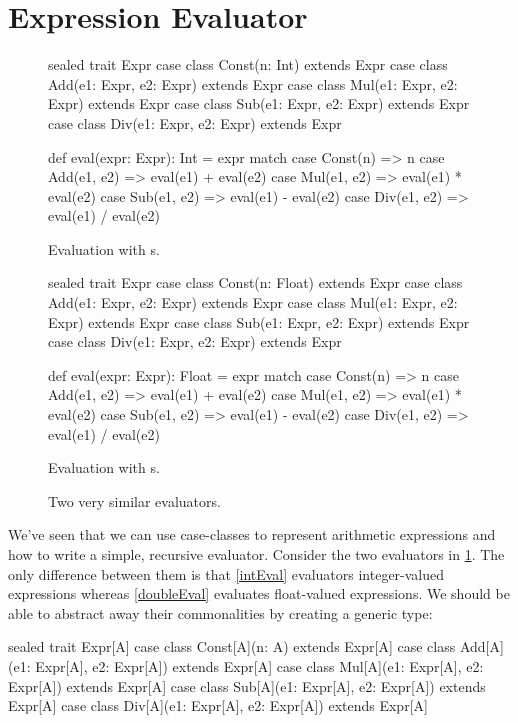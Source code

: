 \documentclass[9pt]{extbook}
\begin{document}
\section{Expression Evaluator}


\begin{figure}
\begin{minipage}{0.45\textwidth}
\begin{scalacode}
sealed trait Expr
case class Const(n: Int) extends Expr
case class Add(e1: Expr, e2: Expr) extends Expr
case class Mul(e1: Expr, e2: Expr) extends Expr
case class Sub(e1: Expr, e2: Expr) extends Expr
case class Div(e1: Expr, e2: Expr) extends Expr

def eval(expr: Expr): Int = expr match {
  case Const(n) => n
  case Add(e1, e2) => eval(e1) + eval(e2)
  case Mul(e1, e2) => eval(e1) * eval(e2)
  case Sub(e1, e2) => eval(e1) - eval(e2)
  case Div(e1, e2) => eval(e1) / eval(e2)
}
\end{scalacode}
\caption{Evaluation with s.}
\label{intEval}
\end{minipage}
\quad\vrule\quad
\begin{minipage}{0.45\textwidth}
\begin{scalacode}
sealed trait Expr
case class Const(n: Float) extends Expr
case class Add(e1: Expr, e2: Expr) extends Expr
case class Mul(e1: Expr, e2: Expr) extends Expr
case class Sub(e1: Expr, e2: Expr) extends Expr
case class Div(e1: Expr, e2: Expr) extends Expr

def eval(expr: Expr): Float = expr match {
  case Const(n) => n
  case Add(e1, e2) => eval(e1) + eval(e2)
  case Mul(e1, e2) => eval(e1) * eval(e2)
  case Sub(e1, e2) => eval(e1) - eval(e2)
  case Div(e1, e2) => eval(e1) / eval(e2)
}
\end{scalacode}
\caption{Evaluation with s.}
\label{doubleEval}
\end{minipage}
\caption{Two very similar evaluators.}\label{twoevals}
\end{figure}


We've seen that we can use case-classes to represent arithmetic expressions
and how to write a simple, recursive evaluator. Consider the two evaluators
in \cref{twoevals}. The only difference between them is that \cref{intEval}
evaluators integer-valued expressions whereas \cref{doubleEval} evaluates
float-valued expressions. We should be able to abstract away their commonalities
by creating a generic type:

\begin{scalacode}
sealed trait Expr[A]
case class Const[A](n: A) extends Expr[A]
case class Add[A](e1: Expr[A], e2: Expr[A]) extends Expr[A]
case class Mul[A](e1: Expr[A], e2: Expr[A]) extends Expr[A]
case class Sub[A](e1: Expr[A], e2: Expr[A]) extends Expr[A]
case class Div[A](e1: Expr[A], e2: Expr[A]) extends Expr[A]
\end{scalacode}
\end{document}
